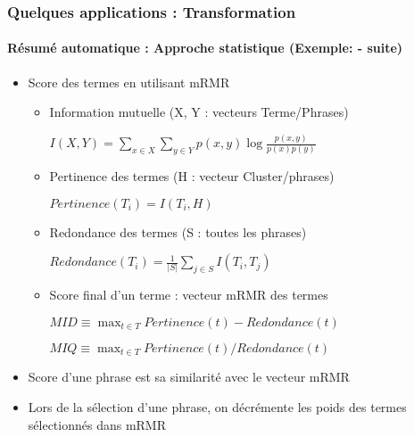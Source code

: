\documentclass[xcolor=table]{beamer}
\begin{document}
\begin{frame}
	\frametitle{Quelques applications : Transformation}
	\framesubtitle{Résumé automatique : Approche statistique (Exemple: \cite{15-oufaida-al} - suite)}

	\begin{itemize}
		\item Score des termes en utilisant mRMR
		\begin{itemize}
			\item Information mutuelle (X, Y : vecteurs Terme/Phrases) 
			
			\begin{center}
				$I(X, Y) = \sum\limits_{x \in X} \sum\limits_{y \in Y} p(x, y) \log \frac{p(x, y)}{p(x) p(y)}$
			\end{center}
			
			\item Pertinence des termes (H : vecteur Cluster/phrases)
			\begin{center}
				$Pertinence(T_i) = I(T_i, H)$
			\end{center}
			
			\item Redondance des termes (S : toutes les phrases)
			
			\begin{center}
				$Redondance(T_i) = \frac{1}{|S|} \sum\limits_{j \in S} I(T_i, T_j)$
			\end{center}
			
			\item Score final d'un terme : vecteur mRMR des termes
			
			\begin{center}
				$MID \equiv \max_{t \in T} Pertinence(t) - Redondance(t)$
			
			$MIQ \equiv \max_{t \in T} Pertinence(t) / Redondance(t)$
			\end{center}
		\end{itemize}
		
		\item Score d'une phrase est sa similarité avec le vecteur mRMR
		
		\item Lors de la sélection d'une phrase, on décrémente les poids des termes sélectionnés dans mRMR
	\end{itemize}
	
\end{frame}
\end{document}
